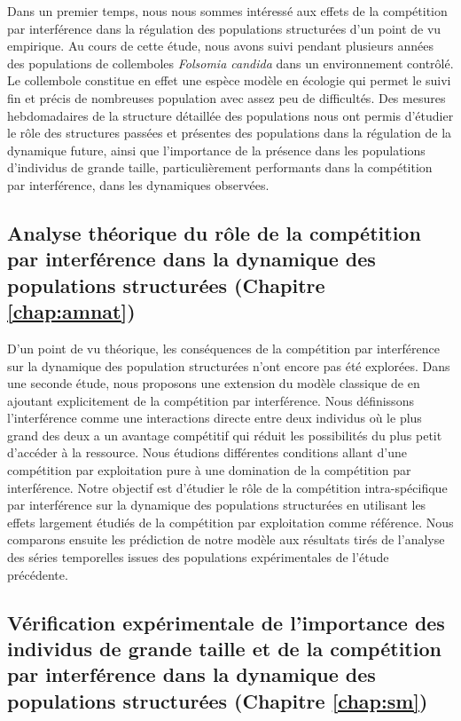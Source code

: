 Dans un premier temps, nous nous sommes intéressé aux effets de la compétition
par interférence dans la régulation des populations structurées d'un point de vu
empirique. Au cours de cette étude, nous avons suivi pendant plusieurs années
des populations de collemboles \textit{Folsomia candida} dans un environnement
contrôlé. Le collembole constitue en effet une espèce modèle en écologie
\autocites{fountain2005a} qui permet le suivi fin et précis de nombreuses
population avec assez peu de difficultés. Des mesures hebdomadaires de la
structure détaillée des populations nous ont permis d'étudier le rôle des
structures passées et présentes des populations dans la régulation de la
dynamique future, ainsi que l'importance de la présence dans les populations
d'individus de grande taille, particulièrement performants dans la compétition par interférence, dans les
dynamiques observées. 

\subsection{Analyse théorique du rôle de la compétition par interférence dans
la dynamique des populations structurées (Chapitre \ref{chap:amnat})}

D'un point de vu théorique, les conséquences de la compétition par interférence
sur la dynamique des population structurées n'ont encore pas été explorées. Dans
une seconde étude, nous proposons une extension du modèle classique de
\textcites{kooijman1984a} en ajoutant explicitement de la compétition par
interférence. Nous définissons l'interférence comme une interactions directe
entre deux individus où le plus grand des deux a un avantage compétitif qui
réduit les possibilités du plus petit d'accéder à la ressource. Nous étudions
différentes conditions allant d'une compétition par exploitation pure à une
domination de la compétition par interférence. Notre objectif est d'étudier le
rôle de la compétition intra-spécifique par interférence sur la dynamique des
populations structurées en utilisant les effets largement étudiés de la
compétition par exploitation comme référence. Nous comparons ensuite les
prédiction de notre modèle aux résultats tirés de l'analyse des séries
temporelles issues des populations expérimentales de l'étude précédente.

\subsection{Vérification expérimentale de l'importance des individus de
grande taille et de la compétition par interférence dans la dynamique des
populations structurées (Chapitre \ref{chap:sm})}

